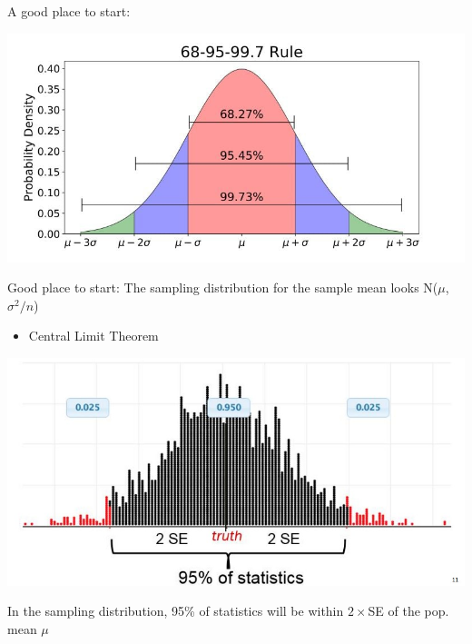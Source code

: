 \documentclass{beamer}
\begin{document}
\begin{frame}{A good place to start:}
\begin{center}
    \includegraphics[scale=.45]{img/empirical_rule.jpg}
\end{center}
\end{frame}

\begin{frame}{Good place to start:}
The sampling distribution for the sample mean looks N($\mu$, $\sigma^2 / n$)
\begin{itemize}
    \item Central Limit Theorem
\end{itemize}
\begin{center}
    \includegraphics[scale=.57]{img/sampling_dist_CI.jpg}
\end{center}
In the sampling distribution, 95\% of statistics will be within $2 \times$SE of the pop. mean $\mu$
\end{frame}
\end{document}
